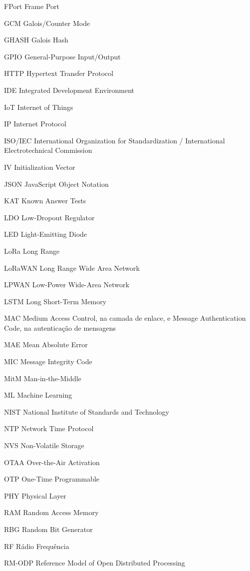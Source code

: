 \documentclass[
	12pt,				%
	openright,			%
	twoside,			%
	a4paper,			%
	english,			%
	brazilian				%
	]{abntex2}
\begin{document}
\begin{siglas}
  \item[FPort] Frame Port
  \item[GCM] Galois/Counter Mode
  \item[GHASH] Galois Hash
  \item[GPIO] General-Purpose Input/Output
  \item[HTTP] Hypertext Transfer Protocol
  \item[IDE] Integrated Development Environment
  \item[IoT] Internet of Things
  \item[IP] Internet Protocol
  \item[ISO/IEC] International Organization for Standardization / International Electrotechnical Commission
  \item[IV] Initialization Vector
  \item[JSON] JavaScript Object Notation
  \item[KAT] Known Answer Tests
  \item[LDO] Low-Dropout Regulator
  \item[LED] Light-Emitting Diode
  \item[LoRa] Long Range
  \item[LoRaWAN] Long Range Wide Area Network
  \item[LPWAN] Low-Power Wide-Area Network
  \item[LSTM] Long Short-Term Memory
  \item[MAC] Medium Access Control, na camada de enlace, e Message Authentication Code, na autenticação de mensagens
  \item[MAE] Mean Absolute Error
  \item[MIC] Message Integrity Code
  \item[MitM] Man-in-the-Middle
  \item[ML] Machine Learning
  \item[NIST] National Institute of Standards and Technology
  \item[NTP] Network Time Protocol
  \item[NVS] Non-Volatile Storage
  \item[OTAA] Over-the-Air Activation
  \item[OTP] One-Time Programmable
  \item[PHY] Physical Layer
  \item[RAM] Random Access Memory
  \item[RBG] Random Bit Generator
  \item[RF] Rádio Frequência
  \item[RM-ODP] Reference Model of Open Distributed Processing

\end{siglas}
\end{document}
